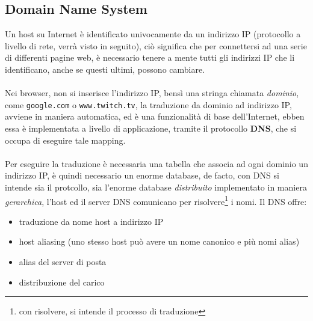 \documentclass[12pt, letterpaper]{article}
\newcommand{\code}[1]{\colorbox{light-gray}{\texttt{#1}}}
\newcommand{\acc}{\\\hphantom{}\\}
\begin{document}
\subsection{Domain Name System}
Un host su Internet è identificato univocamente da un indirizzo IP (protocollo a livello di rete, verrà 
visto in seguito), ciò significa che per connettersi ad una serie di differenti pagine web, è necessario 
tenere a mente tutti gli indirizzi IP che li identificano, anche se questi ultimi, possono cambiare.\acc 
Nei browser, non si inserisce l'indirizzo IP, bensì una stringa chiamata \textit{dominio}, come 
\code{google.com} o \code{www.twitch.tv}, la traduzione da dominio ad indirizzo IP, avviene in maniera automatica, 
ed è una funzionalità di base dell'Internet, ebben essa è implementata a livello di applicazione, tramite il 
protocollo \textbf{DNS}, che si occupa di eseguire tale mapping.\acc 
Per eseguire la traduzione è necessaria una tabella che associa ad ogni dominio un indirizzo IP, è quindi 
necessario un enorme database, de facto, con DNS si intende sia il protcollo, sia l'enorme 
database \textit{distribuito} implementato in maniera \textit{gerarchica}, l'host ed il server DNS comunicano 
per risolvere\footnote{con risolvere, si intende il processo di traduzione} i nomi. Il DNS offre:\begin{itemize}
    \item traduzione da nome host a indirizzo IP
    \item host aliasing (uno stesso host può avere un nome canonico e più nomi alias)
    \item alias del server di posta
    \item distribuzione del carico
\end{itemize}
\end{document}
